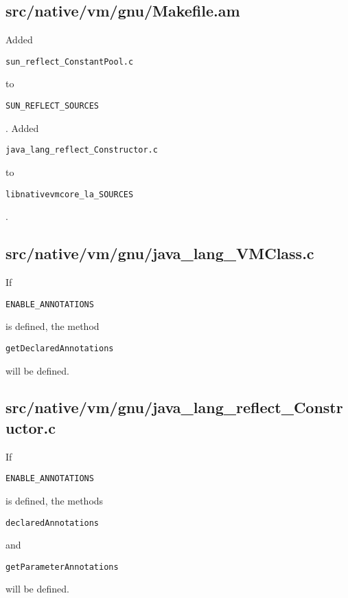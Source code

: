 \documentclass[a4paper, 10pt, titlepage]{scrartcl} %
\begin{document}
\subsection{src/native/vm/gnu/Makefile.am}
\label{sec:src/native/vm/gnu/Makefile.am}

Added \begin{scriptsize}\verb|sun_reflect_ConstantPool|\hspace{0.0pt}\verb|.|\hspace{0.0pt}\verb|c|\end{scriptsize} to \begin{scriptsize}\verb|SUN_REFLECT_SOURCES|\end{scriptsize}.
Added \begin{scriptsize}\verb|java_lang_reflect_Constructor|\hspace{0.0pt}\verb|.|\hspace{0.0pt}\verb|c|\end{scriptsize} to \begin{scriptsize}\verb|libnativevmcore_la_SOURCES|\end{scriptsize}.

\subsection{src/native/vm/gnu/java\_lang\_VMClass.c}
\label{sec:src/native/vm/gnu/java_lang_VMClass.c}

If \begin{scriptsize}\verb|ENABLE_ANNOTATIONS|\end{scriptsize} is defined, the method
\begin{scriptsize}\verb|getDeclaredAnnotations|\end{scriptsize} will be defined.

\subsection{src/native/vm/gnu/java\_lang\_reflect\_Constructor.c}
\label{sec:src/native/vm/gnu/java_lang_reflect_Constructor.c}

If \begin{scriptsize}\verb|ENABLE_ANNOTATIONS|\end{scriptsize} is defined, the methods
\begin{scriptsize}\verb|declaredAnnotations|\end{scriptsize} and \begin{scriptsize}\verb|getParameterAnnotations|\end{scriptsize} will be
defined.
\end{document}
